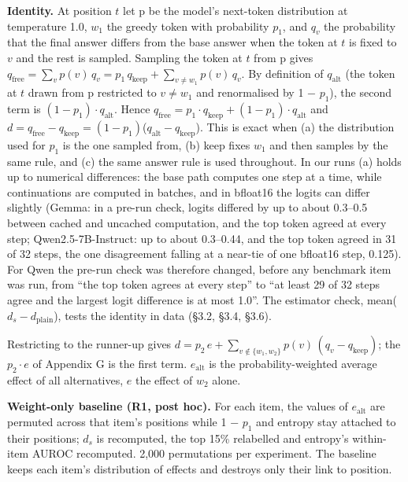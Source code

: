 \documentclass[
  10pt,
  a4paper,
]{article}
\begin{document}
\textbf{Identity.} At position \(t\) let p be the model's next-token distribution at temperature 1.0, \(w_1\) the greedy token with probability \(p_1\), and \(q_{v}\) the probability that the final
answer differs from the base answer when the token at \(t\) is fixed to \(v\) and the rest is sampled. Sampling the token at \(t\) from p gives
\(q_{\mathrm{free}} = \sum_v p(v)\,q_v = p_1\,q_{\mathrm{keep}} + \sum_{v\neq w_1} p(v)\,q_v\). By definition of \(q_{\mathrm{alt}}\) (the token at \(t\) drawn from p restricted to \(v \neq w_1\) and
renormalised by 1 − \(p_1\)), the second term is \((1-p_1) \cdot q_{\mathrm{alt}}\). Hence \(q_{\mathrm{free}} = p_1 \cdot q_{\mathrm{keep}} + (1-p_1) \cdot q_{\mathrm{alt}}\) and
\(d = q_{\mathrm{free}} - q_{\mathrm{keep}} = (1-p_1)\)(\(q_{\mathrm{alt}} - q_{\mathrm{keep}}\)). This is exact when (a) the distribution used for \(p_1\) is the one sampled from, (b) keep fixes
\(w_1\) and then samples by the same rule, and (c) the same answer rule is used throughout. In our runs (a) holds up to numerical differences: the base path computes one step at a time, while
continuations are computed in batches, and in bfloat16 the logits can differ slightly (Gemma: in a pre-run check, logits differed by up to about 0.3--0.5 between cached and uncached computation, and
the top token agreed at every step; Qwen2.5-7B-Instruct: up to about 0.3--0.44, and the top token agreed in 31 of 32 steps, the one disagreement falling at a near-tie of one bfloat16 step, 0.125). For
Qwen the pre-run check was therefore changed, before any benchmark item was run, from ``the top token agrees at every step'' to ``at least 29 of 32 steps agree and the largest logit difference is at
most 1.0''. The estimator check, mean(\(d_{s} - d_{\mathrm{plain}}\)), tests the identity in data (§3.2, §3.4, §3.6).

Restricting to the runner-up gives \(d = p_2\,e + \sum_{v\notin\{w_1,w_2\}} p(v)\,(q_v - q_{\mathrm{keep}})\); the \(p_2 \cdot e\) of Appendix G is the first term. \(e_{\mathrm{alt}}\) is the
probability-weighted average effect of all alternatives, \(e\) the effect of \(w_2\) alone.

\textbf{Weight-only baseline (R1, post hoc).} For each item, the values of \(e_{\mathrm{alt}}\) are permuted across that item's positions while 1 − \(p_1\) and entropy stay attached to their
positions; \(d_{s}\) is recomputed, the top 15\% relabelled and entropy's within-item AUROC recomputed. 2,000 permutations per experiment. The baseline keeps each item's distribution of effects and
destroys only their link to position.
\end{document}
